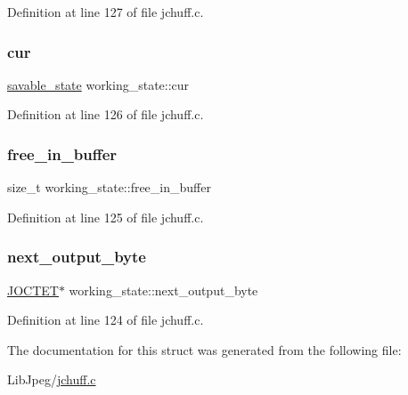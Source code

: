 Definition at line 127 of file jchuff.\+c.

\mbox{\label{structworking__state_a9a55a26239810c0d5ec42c165ee74101}} 
\subsubsection{\texorpdfstring{cur}{cur}}
{\footnotesize\ttfamily \mbox{\hyperlink{structsavable__state}{savable\+\_\+state}} working\+\_\+state\+::cur}



Definition at line 126 of file jchuff.\+c.

\mbox{\label{structworking__state_a2a369c125a91f2aaebbb71ab52e37e7e}} 
\subsubsection{\texorpdfstring{free\_in\_buffer}{free\_in\_buffer}}
{\footnotesize\ttfamily size\+\_\+t working\+\_\+state\+::free\+\_\+in\+\_\+buffer}



Definition at line 125 of file jchuff.\+c.

\mbox{\label{structworking__state_aa672d560261c7d8bb78f4014489f9661}} 
\subsubsection{\texorpdfstring{next\_output\_byte}{next\_output\_byte}}
{\footnotesize\ttfamily \mbox{\hyperlink{jmorecfg_8h_a356ad249f20e691b520da439f92cccbc}{J\+O\+C\+T\+ET}}$\ast$ working\+\_\+state\+::next\+\_\+output\+\_\+byte}



Definition at line 124 of file jchuff.\+c.



The documentation for this struct was generated from the following file\+:\begin{DoxyCompactItemize}
\item 
Lib\+Jpeg/\mbox{\hyperlink{jchuff_8c}{jchuff.\+c}}\end{DoxyCompactItemize}
